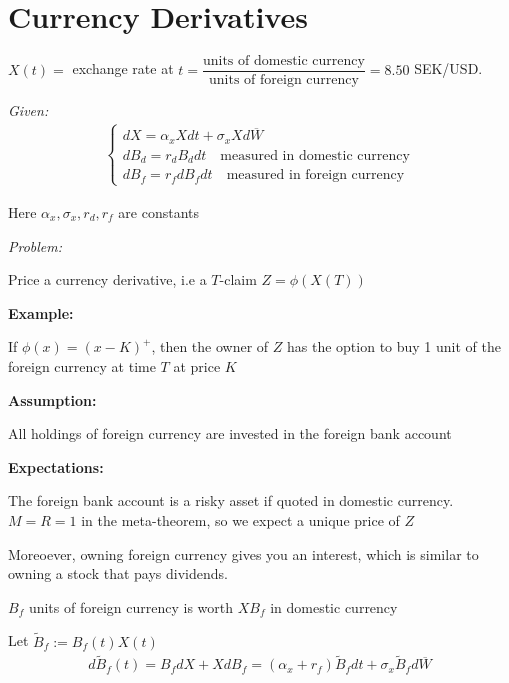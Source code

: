 \section{Currency Derivatives}
\noindent $X(t) = $ exchange rate at $t = \dfrac{\text{units of domestic currency}}{\text{units of foreign currency}} = 8.50$ SEK/USD.
\par\bigskip
\noindent\textit{Given:}
\begin{equation*}
  \begin{gathered}
    \begin{cases}
      dX = \alpha_xXdt+\sigma_xXd\overline{W}\\
      dB_d = r_dB_ddt\quad\text{measured in domestic currency}\\
      dB_f = r_fdB_fdt\quad\text{measured in foreign currency}
    \end{cases}
  \end{gathered}
\end{equation*}\par
\noindent Here $\alpha_x,\sigma_x,r_d,r_f$ are constants
\par\bigskip
\noindent\textit{Problem:}\par
\noindent Price a currency derivative, i.e a $T$-claim $Z = \phi(X(T))$
\par\bigskip
\noindent\textbf{Example:}\par
\noindent If $\phi(x) = (x-K)^+$, then the owner of $Z$ has the option to buy 1 unit of the foreign currency at time $T$ at price $K$
\par\bigskip
\noindent\textbf{Assumption:}\par
\noindent All holdings of foreign currency are invested in the foreign bank account
\par\bigskip
\noindent\textbf{Expectations:}\par
\noindent The foreign bank account is a risky asset if quoted in domestic currency. $M=R=1$ in the meta-theorem, so we expect a unique price of $Z$\par
\noindent Moreoever, owning foreign currency gives you an interest, which is similar to owning a stock that pays dividends.
\par\bigskip
\noindent $B_f$ units of foreign currency is worth $XB_f$ in domestic currency\par
\noindent Let $\widetilde{B}_f:=B_f(t)X(t)$
\begin{equation*}
  \begin{gathered}
    d\widetilde{B}_f(t) = B_fdX+XdB_f=(\alpha_x+r_f)\widetilde{B}_fdt+\sigma_x\widetilde{B}_fd\overline{W}
  \end{gathered}
\end{equation*}\par
